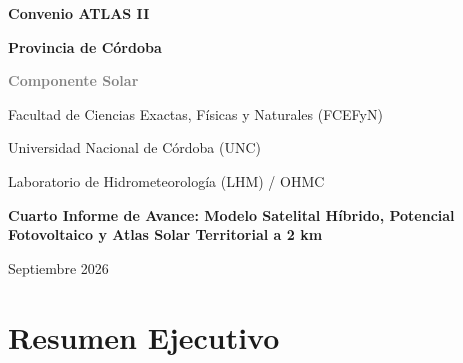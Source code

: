 \documentclass[11pt,a4paper]{article}
\begin{document}
\begin{titlepage}
\centering

\vspace*{-2cm}

\hspace{1.5cm}

\vspace{4.5cm}

{\fontsize{30}{36}\selectfont \textbf{Convenio ATLAS II} \par}
\vspace{0.4cm}
{\fontsize{26}{32}\selectfont \textbf{Provincia de Córdoba} \par}

\vspace{0.8cm}

{\fontsize{22}{28}\selectfont \textcolor{gray}{\textbf{Componente Solar}} \par}

\vspace{2.5cm}

{\large
Facultad de Ciencias Exactas, Físicas y Naturales (FCEFyN) \par}
\vspace{0.2cm}
{\large
Universidad Nacional de Córdoba (UNC) \par}
\vspace{0.2cm}
{\large
Laboratorio de Hidrometeorología (LHM) / OHMC \par}

\vspace{3.5cm}

{\normalsize \textbf{Cuarto Informe de Avance: Modelo Satelital Híbrido, Potencial Fotovoltaico y Atlas Solar Territorial a 2 km} \par}
\vspace{0.8cm}
{\normalsize Septiembre 2026 \par}

\end{titlepage}

\newpage

\section*{Resumen Ejecutivo}
\end{document}
